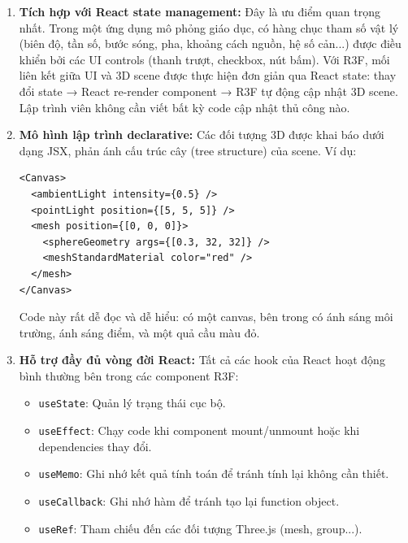 \begin{enumerate}
    \item \textbf{Tích hợp với React state management:} Đây là ưu điểm quan trọng nhất. Trong một ứng dụng mô phỏng giáo dục, có hàng chục tham số vật lý (biên độ, tần số, bước sóng, pha, khoảng cách nguồn, hệ số cản...) được điều khiển bởi các UI controls (thanh trượt, checkbox, nút bấm). Với R3F, mối liên kết giữa UI và 3D scene được thực hiện đơn giản qua React state: thay đổi state → React re-render component → R3F tự động cập nhật 3D scene. Lập trình viên không cần viết bất kỳ code cập nhật thủ công nào.
    
    \item \textbf{Mô hình lập trình declarative:} Các đối tượng 3D được khai báo dưới dạng JSX, phản ánh cấu trúc cây (tree structure) của scene. Ví dụ:
\begin{verbatim}
<Canvas>
  <ambientLight intensity={0.5} />
  <pointLight position={[5, 5, 5]} />
  <mesh position={[0, 0, 0]}>
    <sphereGeometry args={[0.3, 32, 32]} />
    <meshStandardMaterial color="red" />
  </mesh>
</Canvas>
\end{verbatim}
    Code này rất dễ đọc và dễ hiểu: có một canvas, bên trong có ánh sáng môi trường, ánh sáng điểm, và một quả cầu màu đỏ.

    \item \textbf{Hỗ trợ đầy đủ vòng đời React:} Tất cả các hook của React hoạt động bình thường bên trong các component R3F:
    \begin{itemize}
        \item \texttt{useState}: Quản lý trạng thái cục bộ.
        \item \texttt{useEffect}: Chạy code khi component mount/unmount hoặc khi dependencies thay đổi.
        \item \texttt{useMemo}: Ghi nhớ kết quả tính toán để tránh tính lại không cần thiết.
        \item \texttt{useCallback}: Ghi nhớ hàm để tránh tạo lại function object.
        \item \texttt{useRef}: Tham chiếu đến các đối tượng Three.js (mesh, group...).
    \end{itemize}
    

\end{enumerate}
